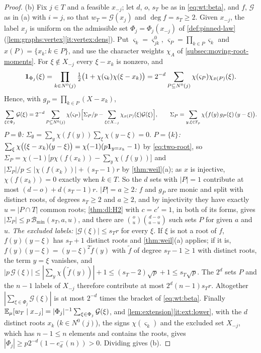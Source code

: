\begin{proof}
(b) Fix $j\in T$ and a feasible $x_{-j}$; let $d$, $o$, $s_T$ be as in
\eqref{eq:wt:beta}, and $f$, $\mathcal G$ as in (a) with $i=j$, so that
$w_T=\mathcal G(x_j)$ and $\deg f=s_T\ge2$. Given $x_{-j}$, the label $x_j$ is
uniform on the admissible set $\Phi_j=\Phi_j(x_{-j})$ of \cref{def:pinned-law}
(\cref{lem:graphs:vertex}\ref{it:vertex:dens}). Put $\varsigma_k=\varsigma^0_{jk}$,
$\varsigma_P=\prod_{k\in P}\varsigma_k$ and $x(P)=\{x_k:k\in P\}$, and use the
character weights $\chi_A$ of \cref{subsec:moving-root-moments}. For
$\xi\notin X_{-j}$ every $\xi-x_k$ is nonzero, and
\[
 \mathbf 1_{\Phi_j}(\xi)=\prod_{k\in N^0(j)}\tfrac12\big(1+\chi(\varsigma_k)\chi(\xi-x_k)\big)
 =2^{-d}\sum_{P\subseteq N^0(j)}\chi(\varsigma_P)\chi_{x(P)}(\xi).
\]
Hence, with $g_P=\prod_{k\in P}(X-x_k)$,
\[
 \sum_{\xi\in\Phi_j}\mathcal G(\xi)=2^{-d}\sum_{P\subseteq N^0(j)}\chi(\varsigma_P)
 \Big[\Sigma_P/p-\sum_{\xi\in X_{-j}}\chi_{x(P)}(\xi)\mathcal G(\xi)\Big],
 \qquad
 \Sigma_P=\sum_{y,\xi\in\mathbb F_p}\chi\big(f(y)\,g_P(\xi)\,(y-\xi)\big).
\]
\emph{$P=\emptyset$:} $\Sigma_\emptyset=\sum_y\chi(f(y))\sum_\xi\chi(y-\xi)=0$.
\emph{$P=\{k\}$:} $\sum_\xi\chi\big((\xi-x_k)(y-\xi)\big)=\chi(-1)(p\mathbf 1_{y=x_k}-1)$
by \eqref{eq:two-root}, so $\Sigma_P=\chi(-1)\big[p\chi(f(x_k))-\sum_y\chi(f(y))\big]$
and $|\Sigma_P|/p\le|\chi(f(x_k))|+(s_T-1)r$ by \cref{thm:weil}(a); as $x$ is
injective, $\chi(f(x_k))=0$ exactly when $k\in T$. So the $d$ sets with $|P|=1$
contribute at most $(d-o)+d(s_T-1)r$. \emph{$|P|=a\ge2$:} $f$ and $g_P$ are monic
and split with distinct roots, of degrees $s_T\ge2$ and $a\ge2$, and by
injectivity they have exactly $u=|P\cap T|$ common roots; \cref{thm:dl:H2} with
$c=c'=1$, in both of its forms, gives $|\Sigma_P|\le p\,\mathcal B_{\min}(s_T,a,u)$,
and there are $\binom ou\binom{d-o}{a-u}$ such sets $P$ for given $a$ and $u$.
\emph{The excluded labels:} $|\mathcal G(\xi)|\le s_Tr$ for every $\xi$. If $\xi$
is not a root of $f$, $f(y)(y-\xi)$ has $s_T+1$ distinct roots and
\cref{thm:weil}(a) applies; if it is, $f(y)(y-\xi)=(y-\xi)^2\tilde f(y)$ with
$\tilde f$ of degree $s_T-1\ge1$ with distinct roots, the term $y=\xi$ vanishes,
and $|p\,\mathcal G(\xi)|\le|\sum_y\chi(\tilde f(y))|+1\le(s_T-2)\sqrt p+1\le
s_T\sqrt p$. The $2^d$ sets $P$ and the $n-1$ labels of $X_{-j}$ therefore
contribute at most $2^d(n-1)s_Tr$. Altogether
$|\sum_{\xi\in\Phi_j}\mathcal G(\xi)|$ is at most $2^{-d}$ times the bracket of
\eqref{eq:wt:beta}. Finally
$\mathbb E_\mu[w_T\mid x_{-j}]=|\Phi_j|^{-1}\sum_{\xi\in\Phi_j}\mathcal G(\xi)$, and
\cref{lem:extension}\ref{it:ext:lower}, with the $d$ distinct roots $x_k$
($k\in N^0(j)$), the signs $\chi(\varsigma_k)$ and the excluded set $X_{-j}$, which
has $n-1\le n$ elements and contains the roots, gives
$|\Phi_j|\ge p2^{-d}(1-e^-_d(n))>0$. Dividing gives (b).


\end{proof}
